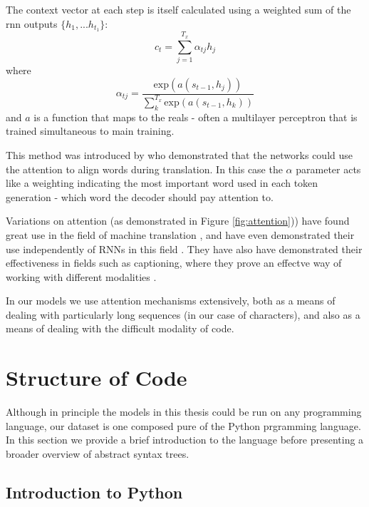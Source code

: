 The context vector at each step is itself calculated using a weighted sum of the rnn outputs $\{h_1,... h_{t_1}\}$:
\begin{equation}
c_t = \sum_{j=1}^{T_x}\alpha_{tj}h_j
\end{equation}
where
\begin{equation}
\alpha_{tj} = \dfrac{\text{exp}(a(s_{t-1}, h_j))}{\sum_k^{T_x}\text{exp}(a(s_{t-1}, h_k))}
\end{equation}
and $a$ is a function that maps to the reals - often a multilayer perceptron that is trained simultaneous to main training. 

This method was introduced by \citet{bahdanau_neural_2014} who demonstrated that the networks could use the attention to align words during translation.
In this case the $\alpha$ parameter acts like a weighting indicating the most important word used in each token generation - which word the decoder should pay attention to.

Variations on attention (as demonstrated in Figure \ref{fig:attention})) have found great use in the field of machine translation  \citep{luong_effective_2015}, and have even demonstrated their use independently of RNNs in this field \citep{vaswani_attention_2017}.  They have also have demonstrated their effectiveness in fields such as captioning, where they prove an effectve way of working with different modalities \citep{xu_show_2015}.

In our models we use attention mechanisms extensively, both as a means of dealing with particularly long sequences (in our case of characters), and also as a means of dealing with the difficult modality of code.




\section{Structure of Code} %
\label{sec:translating_code}

Although in principle the models in this thesis could be run on any programming language, our dataset is one composed pure of the Python prgramming language.  
In this section we provide a brief introduction to the language before presenting a broader overview of abstract syntax trees.

\subsection{Introduction to Python} %
\label{sub:python}


